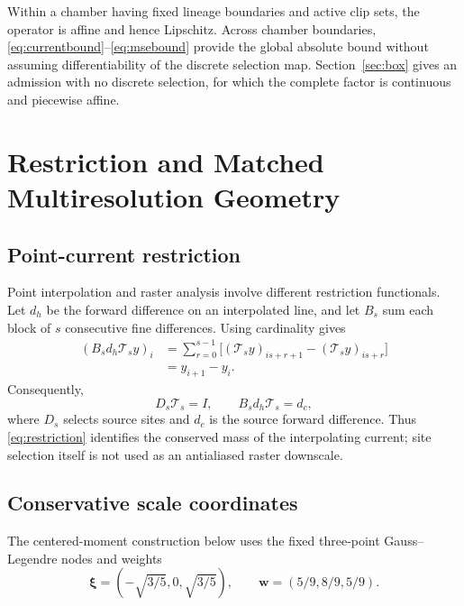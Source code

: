 \documentclass[journal]{IEEEtran}
\newcommand{\Tcal}{\mathcal{T}}
\begin{document}
Within a chamber having fixed lineage boundaries and active clip sets, the
operator is affine and hence Lipschitz. Across chamber boundaries,
\eqref{eq:currentbound}--\eqref{eq:msebound} provide the global absolute
bound without assuming differentiability of the discrete selection map.
Section~\ref{sec:box} gives an admission with no discrete selection, for
which the complete factor is continuous and piecewise affine.

\section{Restriction and Matched Multiresolution Geometry}

\subsection{Point-current restriction}

Point interpolation and raster analysis involve different restriction
functionals. Let \(d_h\) be the forward difference on an interpolated line,
and let \(B_s\) sum each block of \(s\) consecutive fine differences. Using
cardinality gives
\begin{align}
 (B_s d_h\Tcal_s y)_i
 &=\sum_{r=0}^{s-1}
 \bigl[(\Tcal_s y)_{is+r+1}-(\Tcal_s y)_{is+r}\bigr]\nonumber\\
 &=y_{i+1}-y_i.
 \label{eq:telescoping}
\end{align}
Consequently,
\begin{equation}
 D_s\Tcal_s=I,\qquad B_s d_h\Tcal_s=d_c,
 \label{eq:restriction}
\end{equation}
where \(D_s\) selects source sites and \(d_c\) is the source forward
difference. Thus \eqref{eq:restriction} identifies the conserved mass of the
interpolating current; site selection itself is not used as an antialiased
raster downscale.

\subsection{Conservative scale coordinates}

The centered-moment construction below uses the fixed three-point
Gauss--Legendre nodes and weights
\begin{equation}
 \bm\xi=(-\sqrt{3/5},0,\sqrt{3/5}),\qquad
 \bm w=(5/9,8/9,5/9).
 \label{eq:gauss3}
\end{equation}
\end{document}

